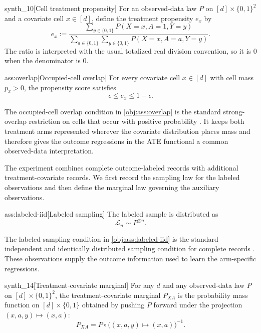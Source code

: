 \documentclass[11pt]{article}
\begin{document}
\begin{definitionv}{synth_10}[Cell treatment propensity]
For an observed-data law \(P\) on \([d]\times\{0,1\}^2\) and a covariate cell \(x\in[d]\), define the treatment propensity \(e_x\) by
\[
e_x
:=
\frac{\sum_{y\in\{0,1\}} P(X=x,A=1,Y=y)}
{\sum_{a\in\{0,1\}}\sum_{y\in\{0,1\}} P(X=x,A=a,Y=y)}.
\]
The ratio is interpreted with the usual totalized real division convention, so it is \(0\) when the denominator is \(0\).
\end{definitionv}

\begin{assumptionv}{ass:overlap}[Occupied-cell overlap]
For every covariate cell \(x\in[d]\) with cell mass \(p_x>0\), the propensity score satisfies
\[
\epsilon \le e_x \le 1-\epsilon .
\]
\end{assumptionv}

The occupied-cell overlap condition in \cref{obj:ass:overlap} is the standard strong-overlap restriction on cells that occur with positive probability \citep{ZengBalakrishnanHanKennedy2024}. It keeps both treatment arms represented wherever the covariate distribution places mass and therefore gives the outcome regressions in the ATE functional a common observed-data interpretation.

The experiment combines complete outcome-labeled records with additional treatment-covariate records. We first record the sampling law for the labeled observations and then define the marginal law governing the auxiliary observations.

\begin{assumptionv}{ass:labeled-iid}[Labeled sampling]
The labeled sample is distributed as
\[
\mathcal L_n \sim P^{\otimes n}.
\]
\end{assumptionv}

The labeled sampling condition in \cref{obj:ass:labeled-iid} is the standard independent and identically distributed sampling condition for complete records \citep{ZengBalakrishnanHanKennedy2024}. These observations supply the outcome information used to learn the arm-specific regressions.

\begin{definitionv}{synth_14}[Treatment-covariate marginal]
For any \(d\) and any observed-data law \(P\) on \([d]\times\{0,1\}^2\), the treatment-covariate marginal \(P_{XA}\) is the probability mass function on \([d]\times\{0,1\}\) obtained by pushing \(P\) forward under the projection \((x,a,y)\mapsto (x,a)\):
\[
P_{XA}
=
P\circ\bigl((x,a,y)\mapsto (x,a)\bigr)^{-1}.
\]
\end{definitionv}
\end{document}
